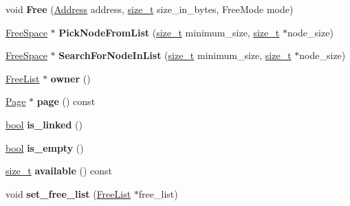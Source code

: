 \begin{DoxyCompactItemize}
void {\bfseries Free} (\mbox{\hyperlink{classuintptr__t}{Address}} address, \mbox{\hyperlink{classsize__t}{size\+\_\+t}} size\+\_\+in\+\_\+bytes, Free\+Mode mode)
\item 
\mbox{\label{classv8_1_1internal_1_1FreeListCategory_ae46d192ee315a30a925eeafa4a94aa86}} 
\mbox{\hyperlink{classv8_1_1internal_1_1FreeSpace}{Free\+Space}} $\ast$ {\bfseries Pick\+Node\+From\+List} (\mbox{\hyperlink{classsize__t}{size\+\_\+t}} minimum\+\_\+size, \mbox{\hyperlink{classsize__t}{size\+\_\+t}} $\ast$node\+\_\+size)
\item 
\mbox{\label{classv8_1_1internal_1_1FreeListCategory_a949ff56032f5d2c8a87f2565b02a49a2}} 
\mbox{\hyperlink{classv8_1_1internal_1_1FreeSpace}{Free\+Space}} $\ast$ {\bfseries Search\+For\+Node\+In\+List} (\mbox{\hyperlink{classsize__t}{size\+\_\+t}} minimum\+\_\+size, \mbox{\hyperlink{classsize__t}{size\+\_\+t}} $\ast$node\+\_\+size)
\item 
\mbox{\label{classv8_1_1internal_1_1FreeListCategory_a1a900f1e9bb903ee4f10a13d6a1c1231}} 
\mbox{\hyperlink{classv8_1_1internal_1_1FreeList}{Free\+List}} $\ast$ {\bfseries owner} ()
\item 
\mbox{\label{classv8_1_1internal_1_1FreeListCategory_ab89c026480e345fa48733935290610eb}} 
\mbox{\hyperlink{classv8_1_1internal_1_1Page}{Page}} $\ast$ {\bfseries page} () const
\item 
\mbox{\label{classv8_1_1internal_1_1FreeListCategory_ac238d461f0673c7626b454f2ddeca94f}} 
\mbox{\hyperlink{classbool}{bool}} {\bfseries is\+\_\+linked} ()
\item 
\mbox{\label{classv8_1_1internal_1_1FreeListCategory_a7216c7b46bede002b7c76bfaff070565}} 
\mbox{\hyperlink{classbool}{bool}} {\bfseries is\+\_\+empty} ()
\item 
\mbox{\label{classv8_1_1internal_1_1FreeListCategory_a840b35c4323d1d5b6636e476dcb936ae}} 
\mbox{\hyperlink{classsize__t}{size\+\_\+t}} {\bfseries available} () const
\item 
\mbox{\label{classv8_1_1internal_1_1FreeListCategory_a1029a291e100bbdde30a41b93db80491}} 
void {\bfseries set\+\_\+free\+\_\+list} (\mbox{\hyperlink{classv8_1_1internal_1_1FreeList}{Free\+List}} $\ast$free\+\_\+list)
\end{DoxyCompactItemize}
